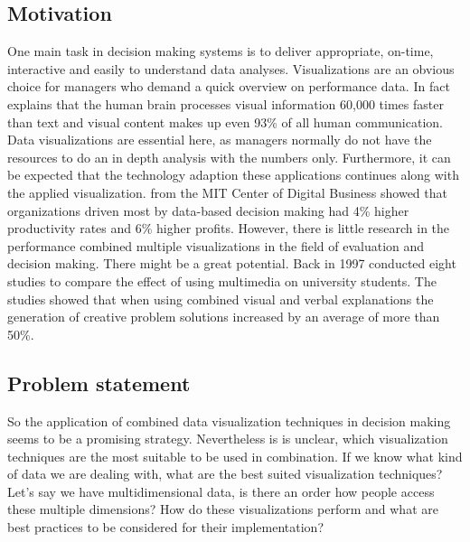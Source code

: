 \documentclass{article}
\begin{document}

\subsection{Motivation}

One main task in decision making systems is to deliver appropriate, on-time, interactive and easily to understand data analyses.
Visualizations are an obvious choice for managers who demand a quick overview on performance data.
In fact \textcite{Kusinitz2014} explains that the human brain processes visual information 60,000 times faster than text and visual content makes up even 93\% of all human communication.
Data visualizations are essential here, as managers normally do not have the resources to do an in depth analysis with the numbers only.
Furthermore, it can be expected that the technology adaption these applications continues along with the applied visualization.
\textcite{McAfee2012} from the MIT Center of Digital Business showed that organizations driven most by data-based decision making had 4\% higher productivity rates and 6\% higher profits.
However, there is little research in the performance combined multiple visualizations in the field of evaluation and decision making.
There might be a great potential.
Back in 1997 \textcite{Mayer1997} conducted eight studies to compare the effect of using multimedia on university students.
The studies showed that when using combined visual and verbal explanations the generation of creative problem solutions increased by an average of more than 50\%.

\subsection{Problem statement}
So the application of combined data visualization techniques in decision making seems to be a promising strategy.
Nevertheless is is unclear, which visualization techniques are the most suitable to be used in combination.
If we know what kind of data we are dealing with, what are the best suited visualization techniques?
Let's say we have multidimensional data, is there an order how people access these multiple dimensions?
How do these visualizations perform and what are best practices to be considered for their implementation?
\end{document}
